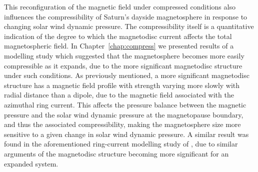This reconfiguration of the magnetic field under compressed conditions also influences the compressibility of Saturn's dayside magnetosphere in response to changing solar wind dynamic pressure. The compressibility itself is a quantitative indication of the degree to which the magnetodisc current affects the total magnetospheric field. In Chapter~\ref{chap:compress} we presented results of a modelling study which suggested that the magnetosphere becomes more easily compressible as it expands, due to the more significant magnetodisc structure under such conditions. As previously mentioned, a more significant magnetodisc structure has a magnetic field profile  with strength varying more slowly with radial distance than a  dipole, due to the magnetic field associated with the azimuthal ring current. This affects the pressure balance between the magnetic pressure and the solar wind dynamic pressure at the magnetopause boundary, and thus the associated compressibility, making the magnetosphere size more sensitive to a given change in solar wind dynamic pressure. A similar result was found in the aforementioned ring-current modelling study of \citet{bunce2007}, due to similar arguments of the magnetodisc structure becoming more significant for an expanded system.


